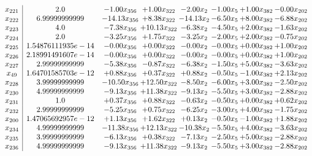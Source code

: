 \documentclass[8pt]{article}
\begin{document}
\[\begin{array}{c| c c@{\hskip 2pt} c@{\hskip 2pt} c@{\hskip 2pt} c@{\hskip 2pt} c@{\hskip 2pt} c@{\hskip 2pt} }
 x_{221}   &  2.0 & -1.00 x_{356} & +  1.00 x_{322} & -2.00 x_{2} & -1.00 x_{5} & +  1.00 x_{382} & -0.00 x_{202}\\
 x_{222}   &  6.99999999999 & -14.13 x_{356} & +  8.38 x_{322} & -14.13 x_{2} & -6.50 x_{5} & +  8.00 x_{382} & -6.88 x_{202}\\
 x_{223}   &  4.0 & -7.38 x_{356} & + 10.13 x_{322} & -6.38 x_{2} & -4.50 x_{5} & +  2.00 x_{382} & -1.63 x_{202}\\
 x_{224}   &  2.0 & -3.25 x_{356} & +  1.75 x_{322} & -3.25 x_{2} & -2.00 x_{5} & +  2.00 x_{382} & -0.75 x_{202}\\
 x_{225}   &  1.54876111935e-14 & -0.00 x_{356} & +  0.00 x_{322} & -0.00 x_{2} & -0.00 x_{5} & +  0.00 x_{382} & +  1.00 x_{202}\\
 x_{226}   &  2.18991491607e-14 & -0.00 x_{356} & +  0.00 x_{322} & -0.00 x_{2} & -0.00 x_{5} & +  0.00 x_{382} & +  1.00 x_{202}\\
 x_{227}   &  2.99999999999 & -5.38 x_{356} & -0.87 x_{322} & -6.38 x_{2} & -1.50 x_{5} & +  5.00 x_{382} & -3.63 x_{202}\\
 x_{49}   &  1.64701585703e-12 & +  0.88 x_{356} & +  0.37 x_{322} & +  0.88 x_{2} & -0.50 x_{5} & -1.00 x_{382} & +  2.13 x_{202}\\
 x_{228}   &  3.99999999999 & -10.50 x_{356} & + 12.50 x_{322} & -8.50 x_{2} & -6.00 x_{5} & +  3.00 x_{382} & -2.50 x_{202}\\
 x_{230}   &  4.99999999999 & -9.13 x_{356} & + 11.38 x_{322} & -9.13 x_{2} & -5.50 x_{5} & +  3.00 x_{382} & -2.88 x_{202}\\
 x_{231}   &  1.0 & +  0.37 x_{356} & +  0.88 x_{322} & -0.63 x_{2} & -0.50 x_{5} & +  0.00 x_{382} & +  0.62 x_{202}\\
 x_{232}   &  2.99999999999 & -5.25 x_{356} & +  0.75 x_{322} & -6.25 x_{2} & -3.00 x_{5} & +  4.00 x_{382} & -1.75 x_{202}\\
 x_{200}   &  1.47065692957e-12 & +  1.13 x_{356} & +  1.62 x_{322} & +  0.13 x_{2} & -0.50 x_{5} & -1.00 x_{382} & +  1.88 x_{202}\\
 x_{234}   &  4.99999999999 & -11.38 x_{356} & + 12.13 x_{322} & -10.38 x_{2} & -5.50 x_{5} & +  4.00 x_{382} & -3.63 x_{202}\\
 x_{235}   &  3.99999999999 & -6.13 x_{356} & +  0.38 x_{322} & -7.13 x_{2} & -2.50 x_{5} & +  5.00 x_{382} & -2.88 x_{202}\\
 x_{236}   &  4.99999999999 & -9.13 x_{356} & + 11.38 x_{322} & -9.13 x_{2} & -5.50 x_{5} & +  3.00 x_{382} & -2.88 x_{202}\\

\end{array}\]
\end{document}
